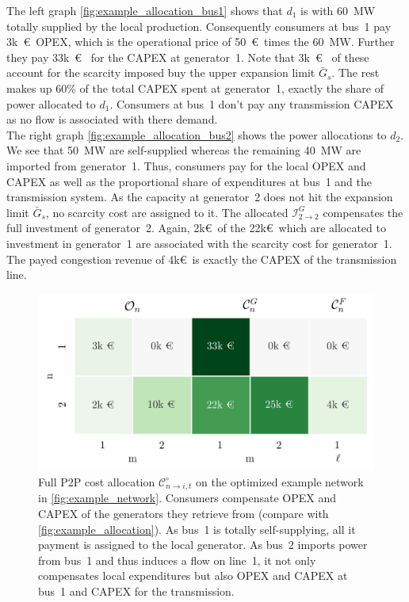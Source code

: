 \documentclass[11pt,twocolumn]{article}
\newcommand{\kk}{k\euro~}
\newcommand{\capacitygenerationupper}{\bar{G}_{s}}
\newcommand{\cost}[1][\circ]{\mathcal{C}^{#1}}
\newcommand{\capexgeneration}{\mathcal{I}^G}
\newcommand{\allocatecost}[1][n \rightarrow i]{\cost_{#1, t}}
\newcommand{\allocatecapexgeneration}[1][n \rightarrow s,t]{\capexgeneration_{#1}}
\begin{document}
The left graph \cref{fig:example_allocation_bus1} shows that $d_1$ is with 60~MW totally supplied by the local production. Consequently consumers at bus~1 pay 3k~\euro~OPEX, which is the operational price of 50~\euro\, times the 60~MW. Further they pay 33k~\euro~ for the CAPEX at generator~1. Note that 3k~\euro~ of these account for the scarcity imposed buy the upper expansion limit $\capacitygenerationupper$. The rest makes up 60\% of the total CAPEX spent at generator~1, exactly the share of power allocated to $d_1$. Consumers at bus~1 don't pay any transmission CAPEX as no flow is associated with there demand. \\
The right graph \cref{fig:example_allocation_bus2} shows the power allocations to $d_2$. We see that 50~MW are self-supplied whereas the remaining 40~MW are imported from generator~1. Thus, consumers pay for the local OPEX and CAPEX as well as the proportional share of expenditures at bus~1 and the transmission system. As the capacity at generator~2 does not hit the expansion limit $\capacitygenerationupper$, no scarcity cost are assigned to it. The allocated $\allocatecapexgeneration[2\rightarrow 2]$  compensates  the full investment of generator~2. Again, 2\kk of the 22\kk which are allocated to investment in generator~1 are associated with the scarcity cost for generator~1. The payed congestion revenue of 4\kk is exactly the CAPEX of the transmission line.   
% 
\begin{figure}[h]
    \centering
    \includegraphics[width=\linewidth]{example_payoff_net_ptpf.png}
    \caption{Full P2P cost allocation $\allocatecost$ on the optimized example network in \cref{fig:example_network}. Consumers compensate OPEX and CAPEX of the generators they retrieve from (compare with \cref{fig:example_allocation}). As bus~1 is totally self-supplying, all it payment is assigned to the local generator.  As bus~2 imports power from bus~1 and thus induces a flow on line~1, it not only compensates local expenditures but also OPEX and CAPEX at bus~1 and CAPEX for the transmission.}
    \label{fig:example_payoff}
\end{figure}    
\end{document}
